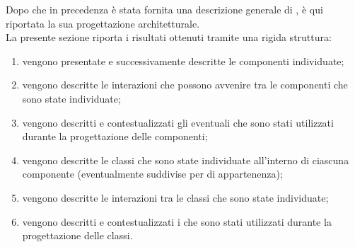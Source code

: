 	Dopo che in precedenza è stata fornita una descrizione generale di , è qui riportata la sua progettazione architetturale.\\
	La presente sezione riporta i risultati ottenuti tramite una rigida struttura:
	\begin{enumerate}
		\item vengono presentate e successivamente descritte le componenti individuate;
		\item vengono descritte le interazioni che possono avvenire tra le componenti che sono state individuate;
		\item vengono descritti e contestualizzati gli eventuali  che sono stati utilizzati durante la progettazione delle componenti;
		\item vengono descritte le classi che sono state individuate all'interno di ciascuna componente (eventualmente suddivise per  di appartenenza);
		\item vengono descritte le interazioni tra le classi che sono state individuate;
		\item vengono descritti e contestualizzati i  che sono stati utilizzati durante la progettazione delle classi.
	\end{enumerate}
	

